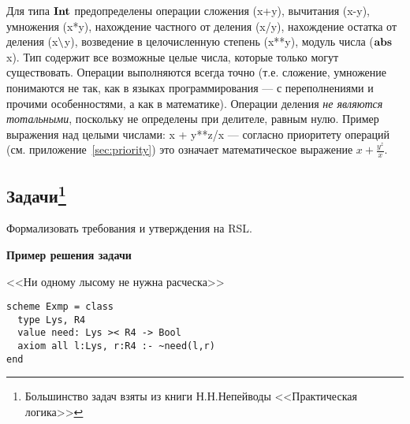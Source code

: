 \documentclass[14pt]{extreport}
\begin{document}
Для типа $\textbf{Int}$ предопределены операции сложения (x+y), вычитания (x-y), умножения (x*y), нахождение частного от деления (x/y), нахождение остатка от деления (x$\mathop{\setminus}$y), возведение в целочисленную степень (x**y), модуль числа ($\mathop{\textbf{abs}}$ x). Тип содержит все возможные целые числа, которые только могут существовать. Операции выполняются всегда точно (т.е. сложение, умножение понимаются не так, как в языках программирования --- с переполнениями и прочими особенностями, а как в математике). Операции деления \emph{не являются тотальными}, поскольку не определены при делителе, равным нулю. Пример выражения над целыми числами: x + y**z/x --- согласно приоритету операций (см. приложение~\ref{sec:priority}) это означает математическое выражение $x + \frac{y^z}{x}$.


\subsection*{Задачи\footnote{Большинство задач взяты из книги Н.Н.Непейводы <<Практическая логика>>}}

Формализовать требования и утверждения на RSL.

\textbf{Пример решения задачи}

<<Ни одному лысому не нужна расческа>>

\begin{lstlisting}
scheme Exmp = class
  type Lys, R4
  value need: Lys >< R4 -> Bool
  axiom all l:Lys, r:R4 :- ~need(l,r)
end
\end{lstlisting}
\end{document}
